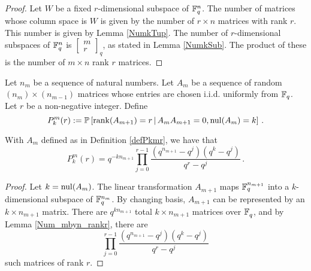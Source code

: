 \begin{proof}
  Let $W$ be a fixed $r$-dimensional subspace of $\mathbb{F}_q^{n}$.  The number of
  matrices whose column space is $W$ is given by the number of $r\times n$
  matrices with rank $r$.  This number is given by Lemma \ref{NumkTup}. The
  number of $r$-dimensional subspaces of $\mathbb{F}_q^{n}$ is
  $\left[\begin{smallmatrix}m\\r\end{smallmatrix}\right]_q$,  as stated in
  Lemma \ref{NumkSub}.  The product of these is the number of $m\times n$
  rank $r$ matrices.
\end{proof}


\begin{definition}\label{defPkmr}
Let $n_m$ be a sequence of natural numbers. Let $A_m$ be a sequence of random
$(n_m) \times (n_{m-1})$ matrices whose entries are chosen i.i.d. uniformly
from $\mathbb{F}_q$. Let $r$ be a non-negative integer.  Define 
\[
  P^m_k(r) := \mathbb{P} 
  \left[\operatorname{\mathrm{rank}}(A_{m+1}) = r \,|\, A_{m}A_{m+1} = 0, \mathrm{nul}(A_{m}) = k \right] \, .
\]
\end{definition}


\begin{lemma}\label{lemPkmr} With $A_m$ defined as in Definition \ref{defPkmr}, we have that
  \begin{equation}
    P^m_k(r) = 
    q^{-kn_{m+1}}\prod_{j=0}^{r-1} \frac{(q^{n_{m+1}}-q^j) (q^k - q^j)}{q^r - q^j} \, . %
	 \label{eqn:Pmkr}
       \end{equation}
\end{lemma}
\begin{proof}
  Let $ k = \mathrm{nul}(A_m)$.
The linear transformation $A_{m+1}$ maps 
$\mathbb{F}_q^{n_{m+1}}$ into a $k$-dimensional subspace of
$\mathbb{F}_q^{n_{m}}$. By changing basis, $A_{m+1}$ can be represented by an
$k \times n_{m+1}$ matrix.  There are $q^{kn_{m+1}}$ total $k \times n_{m+1}$
matrices over $\mathbb{F}_q^{}$, and by
Lemma \ref{Num_mbyn_rankr}, there are 
\[
  \prod_{j=0}^{r-1} \frac{(q^{n_{m+1}}-q^j) ( q^k - q^j)}{q^r-q^j}
\]
such matrices of rank $r$.
\end{proof}

